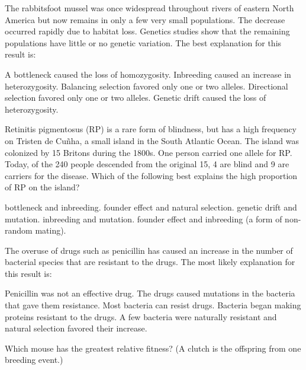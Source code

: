 
\question
The rabbitsfoot mussel was once widespread throughout rivers of eastern North America but now remains in only a few very small populations. The decrease occurred rapidly due to habitat loss. Genetics studies show that the remaining populations have little or no genetic variation. The best explanation for this result is:

\begin{choices}
\choice A bottleneck caused the loss of homozygosity. 
\choice Inbreeding caused an increase in heterozygosity. 
\choice Balancing selection favored only one or two alleles. 
\choice Directional selection favored only one or two alleles. 
\correctchoice Genetic drift caused the loss of heterozygosity. 
\end{choices}

\question
Retinitis pigmentosus (RP) is a rare form of blindness, but has a high frequency on Tristen de Cu\~nha, a small island in the South Atlantic Ocean.  The island was colonized by 15 Britons during the 1800s.  One person carried one allele for RP.  Today, of the 240 people descended from the original 15, 4 are blind and 9 are carriers for the disease.  Which of the following best explains the high proportion of RP on the island?

\begin{choices}
\choice bottleneck and inbreeding.
\choice founder effect and natural selection.
\choice genetic drift and mutation.
\choice inbreeding and mutation.
\correctchoice founder effect and inbreeding (a form of non-random mating).
\end{choices}

\question
The overuse of drugs such as penicillin has caused an increase in the number of bacterial species that are resistant to the drugs. The most likely explanation for this result is:

\begin{choices}
\choice Penicillin was not an effective drug. 
\choice The drugs caused mutations in the bacteria that gave them resistance. 
\choice Most bacteria can resist drugs. 
\choice Bacteria began making proteins resistant to the drugs. 
\correctchoice A few bacteria were naturally resistant and natural selection favored their increase. 
\end{choices}

\question
Which mouse has the greatest relative fitness? (A clutch is the offspring from one breeding event.)


